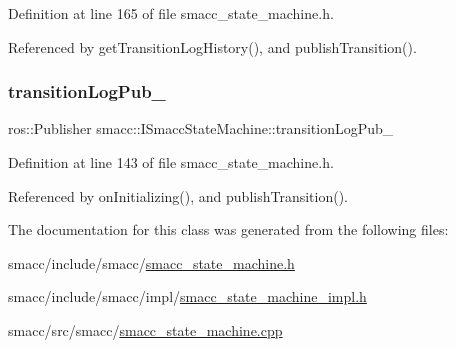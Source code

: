 Definition at line 165 of file smacc\+\_\+state\+\_\+machine.\+h.



Referenced by get\+Transition\+Log\+History(), and publish\+Transition().

\mbox{\label{classsmacc_1_1ISmaccStateMachine_acc42eb050325c1edc77d81675fb1286a}} 
\subsubsection{\texorpdfstring{transition\+Log\+Pub\+\_\+}{transitionLogPub\_}}
{\footnotesize\ttfamily ros\+::\+Publisher smacc\+::\+I\+Smacc\+State\+Machine\+::transition\+Log\+Pub\+\_\+\hspace{0.3cm}{\ttfamily [protected]}}



Definition at line 143 of file smacc\+\_\+state\+\_\+machine.\+h.



Referenced by on\+Initializing(), and publish\+Transition().



The documentation for this class was generated from the following files\+:\begin{DoxyCompactItemize}
\item 
smacc/include/smacc/\hyperlink{smacc__state__machine_8h}{smacc\+\_\+state\+\_\+machine.\+h}\item 
smacc/include/smacc/impl/\hyperlink{smacc__state__machine__impl_8h}{smacc\+\_\+state\+\_\+machine\+\_\+impl.\+h}\item 
smacc/src/smacc/\hyperlink{smacc__state__machine_8cpp}{smacc\+\_\+state\+\_\+machine.\+cpp}\end{DoxyCompactItemize}
